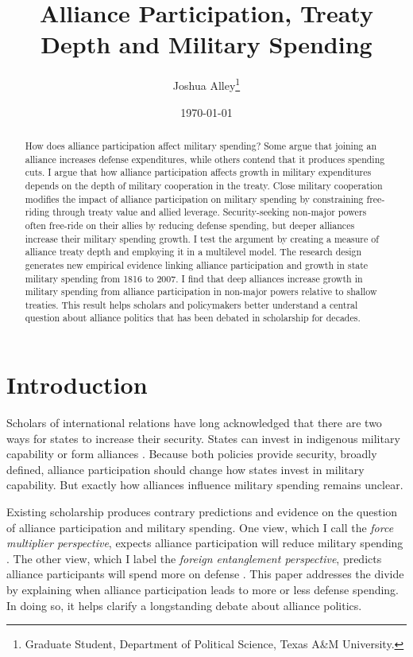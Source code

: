 \documentclass[12pt]{article}
\title{\textbf{Alliance Participation, Treaty Depth and Military Spending}}
\author{Joshua Alley\footnote{Graduate Student,
Department of Political Science, Texas A\&M University.}}
\date{{\normalsize \today}}
\begin{document}
\maketitle 

\doublespace 

\begin{abstract}
How does alliance participation affect military spending? 
Some argue that joining an alliance increases defense expenditures, while others contend that it produces spending cuts.
I argue that how alliance participation affects growth in military expenditures depends on the depth of military cooperation in the treaty. 
Close military cooperation modifies the impact of alliance participation on military spending by constraining free-riding through treaty value and allied leverage.
Security-seeking non-major powers often free-ride on their allies by reducing defense spending, but deeper alliances increase their military spending growth.    
I test the argument by creating a measure of alliance treaty depth and employing it in a multilevel model. 
The research design generates new empirical evidence linking alliance participation and growth in state military spending from 1816 to 2007. 
I find that deep alliances increase growth in military spending from alliance participation in non-major powers relative to shallow treaties.  
This result helps scholars and policymakers better understand a central question about alliance politics that has been debated in scholarship for decades. 
\end{abstract}


 \newpage 


\section{Introduction}


Scholars of international relations have long acknowledged that there are two ways for states to increase their security. 
States can invest in indigenous military capability or form alliances \citep{Morgenthau1948, Altfield1984, Morrow1993}.
Because both policies provide security, broadly defined, alliance participation should change how states invest in military capability. 
But exactly how alliances influence military spending remains unclear. 


Existing scholarship produces contrary predictions and evidence on the question of alliance participation and military spending. 
One view, which I call the \textit{force multiplier perspective}, expects alliance participation will reduce military spending \citep{Morrow1993, Conybeare1994, DigiuseppePoast2016}. 
The other view, which I label the \textit{foreign entanglement perspective}, predicts alliance participants will spend more on defense \citep{Diehl1994, MorganPalmer2006}.
This paper addresses the divide by explaining when alliance participation leads to more or less defense spending. 
In doing so, it helps clarify a longstanding debate about alliance politics.
\end{document}
